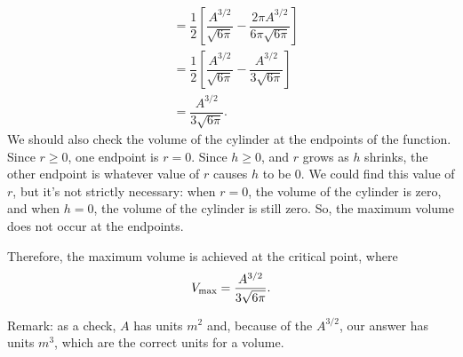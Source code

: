 \begin{solution}
\begin{align*}
&=\dfrac{1}{2}\left[\dfrac{A^{3/2}}{\sqrt{6\pi}}-\dfrac{2\pi A^{3/2}}{6\pi\sqrt{6\pi}}\right]\\
&=\dfrac{1}{2}\left[\dfrac{A^{3/2}}{\sqrt{6\pi}}-\dfrac{A^{3/2}}{3\sqrt{6\pi}}\right]\\
&=\dfrac{A^{3/2}}{3\sqrt{6\pi}}.
\end{align*}
We should also check the volume of the cylinder at the endpoints of the function. Since $r \geq 0$, one endpoint is $r=0$. Since $h \geq 0$, and $r$ grows as $h$ shrinks, the other endpoint is whatever value of $r$ causes $h$ to be 0. We could find this value of $r$, but it's not strictly necessary: when $r=0$, the volume of the cylinder is zero, and when $h=0$, the volume of the cylinder is still zero. So, the maximum volume does not occur at the endpoints.

Therefore, the maximum volume is achieved at the critical
point, where $$
V_{\rm max}=\dfrac{A^{3/2}}{3\sqrt{6\pi}}.
$$

Remark: as a check, $A$ has units $m^2$ and, because of the
         $A^{3/2}$, our answer has units $m^3$, which are the correct
         units for a volume.
\end{solution}


